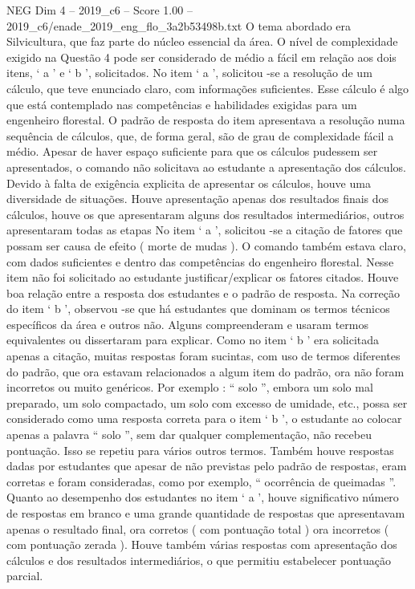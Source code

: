 \begin{textsample}{NEG Dim 4 – 2019\_c6 – Score 1.00 – 2019\_c6/enade\_2019\_eng\_flo\_3a2b53498b.txt}
O tema abordado era Silvicultura, que faz parte do núcleo essencial da área.
O nível de complexidade exigido na Questão 4 pode ser considerado de médio a fácil em relação aos dois itens, ‘ a ’ e ‘ b ’, solicitados.
No item ‘ a ’, solicitou -se a resolução de um cálculo, que teve enunciado claro, com informações suficientes.
Esse cálculo é algo que está contemplado nas competências e habilidades exigidas para um engenheiro florestal.
O padrão de resposta do item apresentava a resolução numa sequência de cálculos, que, de forma geral, são de grau de complexidade fácil a médio.
Apesar de haver espaço suficiente para que os cálculos pudessem ser apresentados, o comando não solicitava ao estudante a apresentação dos cálculos.
Devido à falta de exigência explicita de apresentar os cálculos, houve uma diversidade de situações.
Houve apresentação apenas dos resultados finais dos cálculos, houve os que apresentaram alguns dos resultados intermediários, outros apresentaram todas as etapas No item ‘ a ’, solicitou -se a citação de fatores que possam ser causa de efeito ( morte de mudas ).
O comando também estava claro, com dados suficientes e dentro das competências do engenheiro florestal.
Nesse item não foi solicitado ao estudante justificar/explicar os fatores citados.
Houve boa relação entre a resposta dos estudantes e o padrão de resposta.
Na correção do item ‘ b ’, observou -se que há estudantes que dominam os termos técnicos específicos da área e outros não.
Alguns compreenderam e usaram termos equivalentes ou dissertaram para explicar.
Como no item ‘ b ’ era solicitada apenas a citação, muitas respostas foram sucintas, com uso de termos diferentes do padrão, que ora estavam relacionados a algum item do padrão, ora não foram incorretos ou muito genéricos.
Por exemplo : “ solo ”, embora um solo mal preparado, um solo compactado, um solo com excesso de umidade, etc., possa ser considerado como uma resposta correta para o item ‘ b ’, o estudante ao colocar apenas a palavra “ solo ”, sem dar qualquer complementação, não recebeu pontuação.
Isso se repetiu para vários outros termos.
Também houve respostas dadas por estudantes que apesar de não previstas pelo padrão de respostas, eram corretas e foram consideradas, como por exemplo, “ ocorrência de queimadas ”.
Quanto ao desempenho dos estudantes no item ‘ a ’, houve significativo número de respostas em branco e uma grande quantidade de respostas que apresentavam apenas o resultado final, ora corretos ( com pontuação total ) ora incorretos ( com pontuação zerada ).
Houve também várias respostas com apresentação dos cálculos e dos resultados intermediários, o que permitiu estabelecer pontuação parcial.

\end{textsample}
